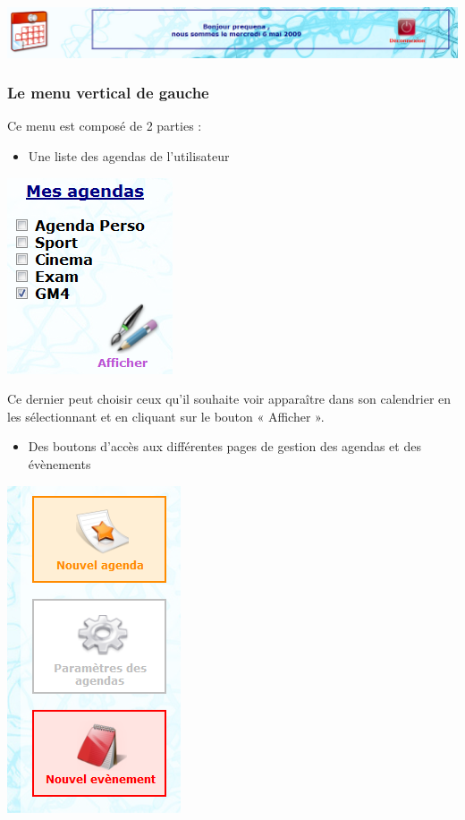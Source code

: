 \documentclass[12pt , a4paper]{article}
\begin{document}
\begin{center}
  \includegraphics[scale=0.4]{./images/accueil4.png}
\end{center}



\subsubsection{Le menu vertical de gauche}
\noindent Ce menu est composé de 2 parties :
\begin{itemize}
\item   Une liste des agendas de l’utilisateur
\end{itemize}

\begin{center}
  \includegraphics[scale=0.6]{./images/calendrier_agenda3.png}
\end{center}

\noindent Ce dernier peut choisir ceux qu’il souhaite voir apparaître dans
son calendrier en les sélectionnant et en cliquant sur le bouton
« Afficher ».

\newpage

\begin{itemize}
\item Des boutons d’accès aux différentes pages de gestion des agendas et des évènements
\end{itemize}

\begin{center}
  \includegraphics[scale=0.6]{./images/accueil5.png}
\end{center}       
\end{document}
